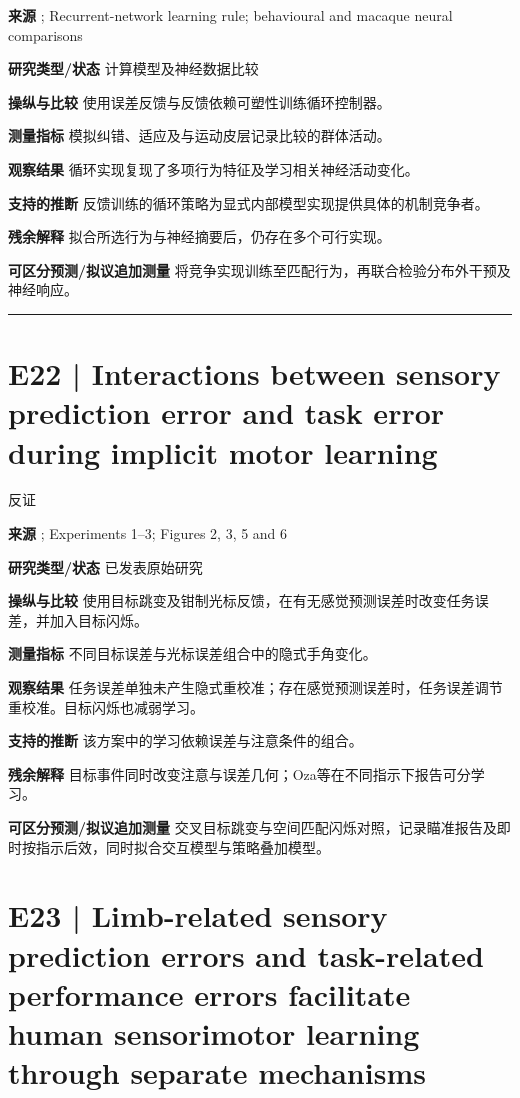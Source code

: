 \documentclass[11pt,a4paper]{article}
\begin{document}
\textbf{来源} \cite{feulner2025}; Recurrent-network learning rule; behavioural and macaque neural comparisons\par
\textbf{研究类型/状态} 计算模型及神经数据比较\par
\textbf{操纵与比较} 使用误差反馈与反馈依赖可塑性训练循环控制器。\par
\textbf{测量指标} 模拟纠错、适应及与运动皮层记录比较的群体活动。\par
\textbf{观察结果} 循环实现复现了多项行为特征及学习相关神经活动变化。\par
\textbf{支持的推断} 反馈训练的循环策略为显式内部模型实现提供具体的机制竞争者。\par
\textbf{残余解释} 拟合所选行为与神经摘要后，仍存在多个可行实现。\par
\textbf{可区分预测/拟议追加测量} 将竞争实现训练至匹配行为，再联合检验分布外干预及神经响应。\par
\bigskip\hrule\medskip\section{E22 | Interactions between sensory prediction error and task error during implicit motor learning}
{\small\sffamily\color{navy} 反证}\par
\textbf{来源} \cite{tsay2022}; Experiments 1--3; Figures 2, 3, 5 and 6\par
\textbf{研究类型/状态} 已发表原始研究\par
\textbf{操纵与比较} 使用目标跳变及钳制光标反馈，在有无感觉预测误差时改变任务误差，并加入目标闪烁。\par
\textbf{测量指标} 不同目标误差与光标误差组合中的隐式手角变化。\par
\textbf{观察结果} 任务误差单独未产生隐式重校准；存在感觉预测误差时，任务误差调节重校准。目标闪烁也减弱学习。\par
\textbf{支持的推断} 该方案中的学习依赖误差与注意条件的组合。\par
\textbf{残余解释} 目标事件同时改变注意与误差几何；Oza等在不同指示下报告可分学习。\par
\textbf{可区分预测/拟议追加测量} 交叉目标跳变与空间匹配闪烁对照，记录瞄准报告及即时按指示后效，同时拟合交互模型与策略叠加模型。\par
\clearpage\section{E23 | Limb-related sensory prediction errors and task-related performance errors facilitate human sensorimotor learning through separate mechanisms}
\end{document}
